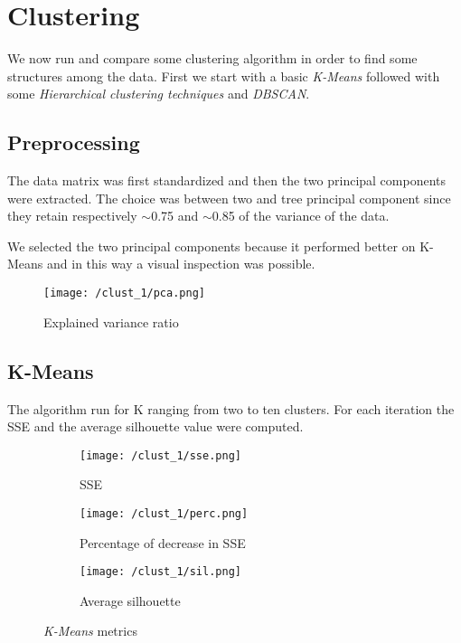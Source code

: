 \documentclass{article}
\begin{document}
\section{Clustering}
We now run and compare some clustering algorithm in order to find some structures among the data. First we start with a basic \emph{K-Means} followed with some \emph{Hierarchical clustering techniques} and \emph{DBSCAN}. 
\subsection{Preprocessing}
The data matrix was first standardized and then the two principal components were extracted. The choice was between two and tree principal component since they retain respectively $\sim$0.75 and $\sim$0.85 of the variance of the data.

We selected the two principal components because it performed better on K-Means and in this way a visual inspection was possible.

\begin{figure}[h!]
    \centering
    \texttt{[image: /clust\_1/pca.png]}
    \caption{Explained variance ratio}
    \label{fig:pca_img}
\end{figure}

\subsection{K-Means}
The algorithm run for K ranging from two to ten clusters. For each iteration the SSE and the average silhouette value were computed.

\begin{figure}[h!]
     \centering
     \begin{subfigure}{0.49\textwidth}
         \centering
         \texttt{[image: /clust\_1/sse.png]}
         \caption{SSE}
         \label{fig:sse_img}
     \end{subfigure}
     \begin{subfigure}{0.49\textwidth}
         \centering
         \texttt{[image: /clust\_1/perc.png]}
         \caption{Percentage of decrease in SSE}
         \label{fig:pdiff_img}
     \end{subfigure}
     
     \begin{subfigure}{0.49\textwidth}
         \centering
         \texttt{[image: /clust\_1/sil.png]}
         \caption{Average silhouette}
         \label{fig:sil_img}
     \end{subfigure}
     \caption{\emph{K-Means} metrics}
    \label{fig:km_metrics}
\end{figure}
\end{document}
